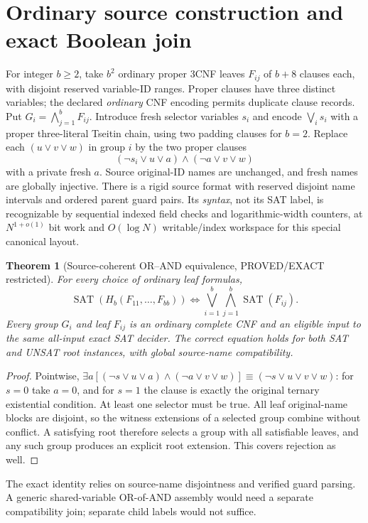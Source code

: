 \documentclass[11pt]{article}
\newtheorem{theorem}{Theorem}
\begin{document}
\section{Ordinary source construction and exact Boolean join}
For integer $b\ge2$, take $b^2$ ordinary proper 3CNF leaves $F_{ij}$ of $b+8$ clauses each, with disjoint reserved variable-ID ranges. Proper clauses have three distinct variables; the declared \emph{ordinary} CNF encoding permits duplicate clause records. Put $G_i=\bigwedge_{j=1}^{b}F_{ij}$. Introduce fresh selector variables $s_i$ and encode $\bigvee_i s_i$ with a proper three-literal Tseitin chain, using two padding clauses for $b=2$. Replace each $(u\vee v\vee w)$ in group $i$ by the two proper clauses
\[
(\neg s_i\vee u\vee a)\wedge(\neg a\vee v\vee w)
\]
with a private fresh $a$. Source original-ID names are unchanged, and fresh names are globally injective. There is a rigid source format with reserved disjoint name intervals and ordered parent guard pairs. Its \emph{syntax}, not its SAT label, is recognizable by sequential indexed field checks and logarithmic-width counters, at $N^{1+o(1)}$ bit work and $O(\log N)$ writable/index workspace for this special canonical layout.

\begin{theorem}[Source-coherent OR--AND equivalence, PROVED/EXACT restricted]
For every choice of ordinary leaf formulas,
\[
\operatorname{SAT}(H_b(F_{11},\ldots,F_{bb}))
\iff \bigvee_{i=1}^{b}\bigwedge_{j=1}^{b}\operatorname{SAT}(F_{ij}).
\]
Every group $G_i$ and leaf $F_{ij}$ is an ordinary complete CNF and an eligible input to the \emph{same all-input} exact SAT decider. The correct equation holds for both SAT and UNSAT root instances, with global source-name compatibility.
\end{theorem}
\begin{proof}
Pointwise, $\exists a[(\neg s\vee u\vee a)\wedge(\neg a\vee v\vee w)]\equiv(\neg s\vee u\vee v\vee w)$: for $s=0$ take $a=0$, and for $s=1$ the clause is exactly the original ternary existential condition. At least one selector must be true. All leaf original-name blocks are disjoint, so the witness extensions of a selected group combine without conflict. A satisfying root therefore selects a group with all satisfiable leaves, and any such group produces an explicit root extension. This covers rejection as well.
\end{proof}
The exact identity relies on source-name disjointness and verified guard parsing. A generic shared-variable OR-of-AND assembly would need a separate compatibility join; separate child labels would not suffice.
\end{document}
